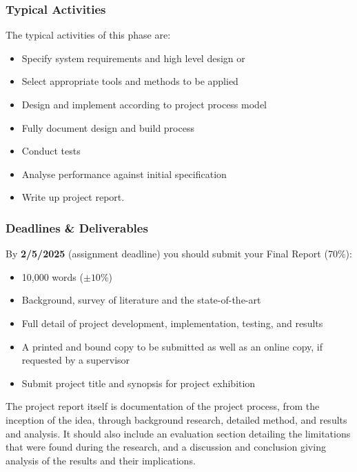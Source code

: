 \subsubsection{Typical Activities}

The typical activities of this phase are: 

\begin{itemize}
    \item Specify system requirements and high level design or
    \item Select appropriate tools and methods to be applied
    \item Design and implement according to project process model
    \item Fully document design and build process
    \item Conduct tests
    \item Analyse performance against initial specification
    \item Write up project report.
\end{itemize}

\subsubsection{Deadlines \& Deliverables}

By \textbf{2/5/2025} (assignment deadline) you should submit your Final Report (70\%):

\begin{itemize}
    \item 10,000 words ($\pm 10\%$)
    \item Background, survey of literature and the state-of-the-art
    \item Full detail of project development, implementation, testing, and results
    \item A printed and bound copy to be submitted as well as an online copy, if requested by a supervisor
    \item Submit project title and synopsis for project exhibition
\end{itemize}

The project report itself is documentation of the project process, from the inception of the idea, through background research, detailed method, and results and analysis. It should also include an evaluation section detailing the limitations that were found during the research, and a discussion and conclusion giving analysis of the results and their implications. 

